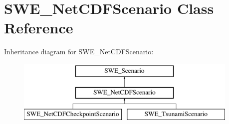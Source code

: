 \hypertarget{classSWE__NetCDFScenario}{\section{S\-W\-E\-\_\-\-Net\-C\-D\-F\-Scenario Class Reference}
\label{classSWE__NetCDFScenario}
}
Inheritance diagram for S\-W\-E\-\_\-\-Net\-C\-D\-F\-Scenario\-:\begin{figure}[H]
\begin{center}
\leavevmode
\includegraphics[height=3.000000cm]{classSWE__NetCDFScenario}
\end{center}
\end{figure}
